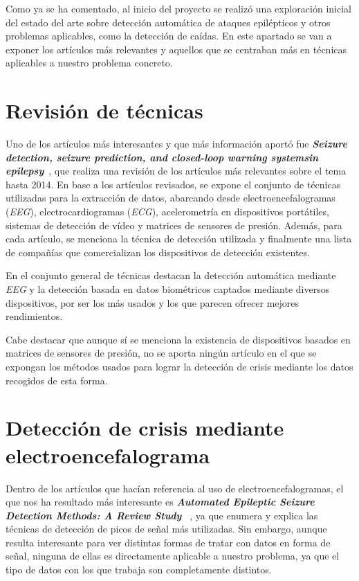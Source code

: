 
Como ya se ha comentado, al inicio del proyecto se realizó una exploración inicial del estado del arte sobre detección automática de ataques epilépticos y otros problemas aplicables, como la detección de caídas. En este apartado se van a exponer los artículos más relevantes y aquellos que se centraban más en técnicas aplicables a nuestro problema concreto. 

\section{Revisión de técnicas}

Uno de los artículos más interesantes y que más información aportó fue \textbf{\textit{Seizure detection, seizure prediction, and closed-loop warning systemsin epilepsy}}~\cite{ramgopal2014epilepsy}, que realiza una revisión de los artículos más relevantes sobre el tema hasta 2014. En base a los artículos revisados, se expone el conjunto de técnicas utilizadas para la extracción de datos, abarcando desde electroencefalogramas (\textit{EEG}), electrocardiogramas (\textit{ECG}), acelerometría en dispositivos portátiles, sistemas de detección de vídeo y matrices de sensores de presión. Además, para cada artículo, se menciona la técnica de detección utilizada y finalmente una lista de compañías que comercializan los dispositivos de detección existentes. 

En el conjunto general de técnicas destacan la detección automática mediante \textit{EEG} y la detección basada en datos biométricos captados mediante diversos dispositivos, por ser los más usados y los que parecen ofrecer mejores rendimientos.  

Cabe destacar que aunque sí se menciona la existencia de dispositivos basados en matrices de sensores de presión, no se aporta ningún artículo en el que se expongan los métodos usados para lograr la detección de crisis mediante los datos recogidos de esta forma. 

\section{Detección de crisis mediante electroencefalograma}

Dentro de los artículos que hacían referencia al uso de electroencefalogramas, el que nos ha resultado más interesante es \textbf{\textit{Automated Epileptic Seizure Detection Methods: A Review
Study
}}~\cite{tzallas2012automated}, ya que enumera y explica las técnicas de detección de picos de señal más utilizadas. Sin embargo, aunque resulta interesante para ver distintas formas de tratar con datos en forma de señal, ninguna de ellas es directamente aplicable a nuestro problema, ya que el tipo de datos con los que trabaja son completamente distintos. 

